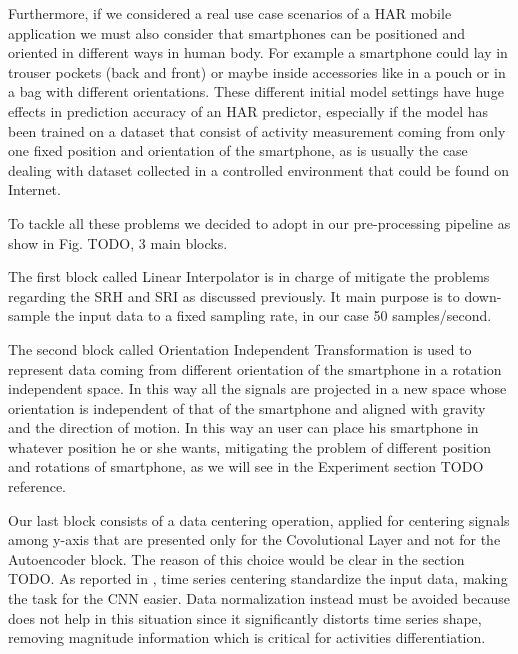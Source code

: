 Furthermore, if we considered a real use case scenarios of a HAR mobile application we must also consider that smartphones can be positioned and oriented in different ways in human body. For example a smartphone could lay in trouser pockets (back and front) or maybe inside accessories like in a pouch or in a bag with different orientations. These different initial model settings have huge effects in prediction accuracy of an HAR predictor, especially if the model has been trained on a dataset that consist of activity measurement coming from only one fixed position and orientation of the smartphone, as is usually the case dealing with dataset collected in a controlled environment that could be found on Internet.

To tackle all these problems we decided to adopt in our pre-processing pipeline as show in Fig. TODO, 3 main blocks.

The first block called Linear Interpolator is in charge of mitigate the problems regarding the SRH and SRI as discussed previously. It main purpose is to down-sample the input data to a fixed sampling rate, in our case 50 samples/second.

The second block called Orientation Independent Transformation is used to represent data coming from different orientation of the smartphone in a rotation independent space. In this way all the signals are projected in a new space whose orientation is independent of that of the smartphone and aligned with gravity and the direction of motion. In this way an user can place his smartphone in whatever position he or she wants, mitigating the problem of different position and rotations of smartphone, as we will see in the Experiment section TODO reference.

Our last block consists of a data centering operation, applied for centering signals among y-axis that are presented only for the Covolutional Layer and not for the Autoencoder block. The reason of this choice would be clear in the section TODO. As reported in \cite{ignatov2018real}, time series centering standardize the input data, making the task for the CNN easier. Data normalization instead must be avoided because does not help in this situation since it significantly distorts time series shape, removing magnitude information which is critical for activities differentiation.

